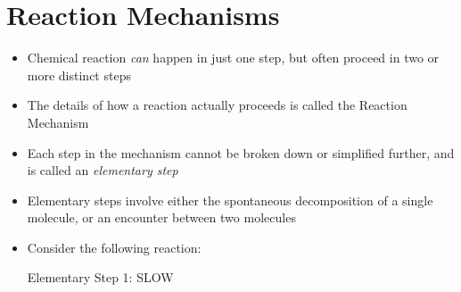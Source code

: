 \documentclass[12pt, openany, letterpaper]{memoir}
\begin{document}
\section{Reaction Mechanisms}
\begin{itemize}
	\item Chemical reaction \emph{can} happen in just one step, but often proceed in two or more distinct steps
	\item The details of how a reaction actually proceeds is called the Reaction Mechanism
	\item Each step in the mechanism cannot be broken down or simplified further, and is called an \emph{elementary step} 
	\item Elementary steps involve either the spontaneous decomposition of a single molecule, or an encounter between two molecules
	\item Consider the following reaction: 
	
	Elementary Step 1:  \hspace{1em} SLOW
	

\end{itemize}
\end{document}
